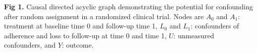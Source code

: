 \documentclass[12pt,A4]{article}
\begin{document}
\par\bigskip
\par\bigskip

\textbf{Fig 1.} Causal directed acyclic graph demonstrating the potential for confounding after random assignment in a randomized clinical trial.
Nodes are $A_0$ and $A_1$: treatment at baseline time 0 and follow-up time 1, $L_0$ and $L_1$: confounders of adherence and loss to follow-up at time 0 and time 1, $U$: unmeasured confounders, and $Y$: outcome. 
\end{document}
